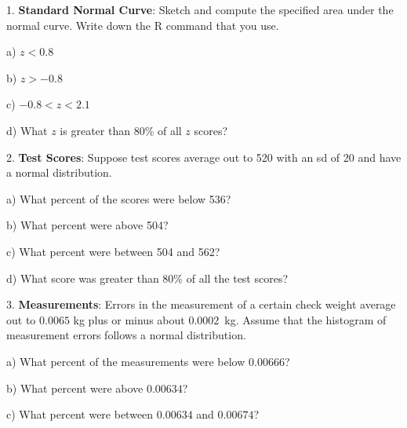 \documentclass[10pt]{article}
\begin{document}
1. \textbf{Standard Normal Curve}:  Sketch and compute the specified area under the normal curve. 
Write down the R command that you use.

\hspace{10pt} a) $z < 0.8$
\vspace{.4in}

\hspace{10pt} b) $z > -0.8$
\vspace{.5in}

\hspace{10pt} c) $-0.8< z < 2.1$
\vspace{.5in}

\hspace{10pt} d) What $z$ is greater than 80\% of all $z$ scores?
\vspace{.5in}

2. \textbf{Test Scores}:  Suppose test scores average out to 520 with an sd of 20 and have
a normal distribution.

\hspace{10pt} a) What percent of the scores were below 536?
\vspace{1.4in}

\hspace{10pt} b) What percent were above 504?
\vspace{1.4in}

\hspace{10pt} c) What percent were between 504 and 562?
\vspace{1.4in}

\hspace{10pt} d) What score was greater than 80\% of all the test scores?
\vspace{1.4in}


3. \textbf{Measurements}: Errors in the measurement of a certain check weight average out to $0.0065$ kg plus or minus
about $0.0002$~kg.  Assume that the histogram of measurement errors follows a normal 
distribution.

\hspace{10pt} a) What percent of the measurements were below 0.00666?
\vspace{1.4in}

\hspace{10pt} b) What percent were above $0.00634$?
\vspace{1.4in}

\hspace{10pt} c) What percent were between $0.00634$ and $0.00674$?
\vspace{1.4in}
\end{document}
